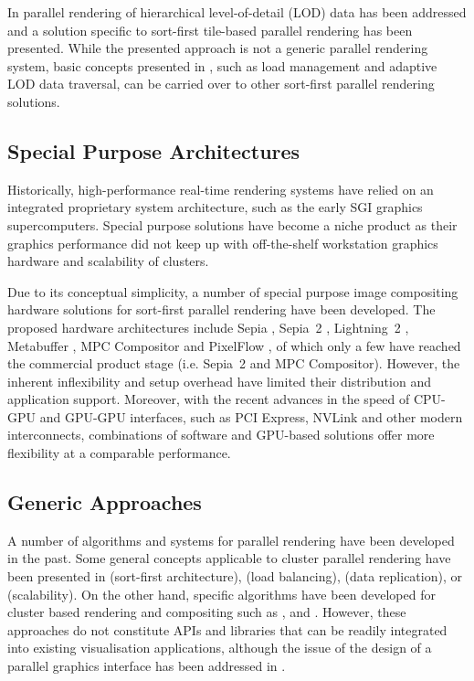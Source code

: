 In \cite{NC:07} parallel rendering of hierarchical level-of-detail (LOD) data
has been addressed and a solution specific to sort-first tile-based parallel
rendering has been presented. While the presented approach is not a generic
parallel rendering system, basic concepts presented in \cite{NC:07}, such as load
management and adaptive LOD data traversal, can be carried over to other
sort-first parallel rendering solutions.

\subsection{Special Purpose Architectures}

Historically, high-performance real-time rendering systems have relied on an
integrated proprietary system architecture, such as the early SGI graphics supercomputers. Special purpose solutions have become a niche product as their
graphics performance did not keep up with off-the-shelf workstation graphics
hardware and scalability of clusters.

Due to its conceptual simplicity, a number of special purpose image compositing
hardware solutions for sort-first parallel rendering have been developed. The
proposed hardware architectures include Sepia \cite {MHS:99a,sepia}, Sepia~2
\cite{LMSBHa:01,LMSBH:01}, Lightning~2 \cite{Stoll01}, Metabuffer
\cite{Blanke00,Zhang01}, MPC Compositor \cite{Muraki01} and PixelFlow
\cite{Molnar92,Eyles97}, of which only a few have reached the commercial
product stage (i.e. Sepia~2 and MPC Compositor). However, the inherent
inflexibility and setup overhead have limited their distribution and
application support. Moreover, with the recent advances in the speed of CPU-GPU
and GPU-GPU interfaces, such as PCI Express, NVLink and other modern
interconnects, combinations of software and GPU-based solutions offer more
flexibility at a comparable performance.

\subsection{Generic Approaches}

A number of algorithms and systems for parallel rendering have been developed in
the past. Some general concepts applicable to cluster parallel
rendering have been presented in \cite{Mueller:95,Mueller:97} (sort-first
architecture), \cite{SZFLS:99,SFLS:00} (load balancing), \cite{SFL:01} (data
replication), or \cite{CMF:05,CM:06} (scalability). On the other hand, specific
algorithms have been developed for cluster based rendering and compositing such
as \cite{AP:98}, \cite{CKS:02} and \cite{YYC:01,SMLAP:03}. However, these
approaches do not constitute APIs and libraries that can be readily integrated
into existing visualisation applications, although the issue of the design of a
parallel graphics interface has been addressed in \cite{Igehy98}.

